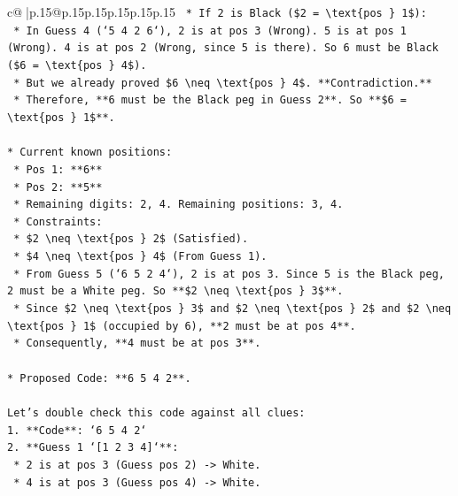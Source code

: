 \documentclass{article}
\begin{document}
{\begin{supertabular}{c@{$\;$}|p{.15\linewidth}@{}p{.15\linewidth}p{.15\linewidth}p{.15\linewidth}p{.15\linewidth}p{.15\linewidth}}
{{{\texttt{        *   If 2 is Black (\$2 = \textbackslash{}text\{pos \} 1\$):} \\
\texttt{            *   In Guess 4 (`5 4 2 6`), 2 is at pos 3 (Wrong). 5 is at pos 1 (Wrong). 4 is at pos 2 (Wrong, since 5 is there). So 6 must be Black (\$6 = \textbackslash{}text\{pos \} 4\$).} \\
\texttt{            *   But we already proved \$6 \textbackslash{}neq \textbackslash{}text\{pos \} 4\$. **Contradiction.**} \\
\texttt{        *   Therefore, **6 must be the Black peg in Guess 2**. So **\$6 = \textbackslash{}text\{pos \} 1\$**.} \\
\\ 
\texttt{*   Current known positions:} \\
\texttt{    *   Pos 1: **6**} \\
\texttt{    *   Pos 2: **5**} \\
\texttt{    *   Remaining digits: 2, 4. Remaining positions: 3, 4.} \\
\texttt{    *   Constraints:} \\
\texttt{        *   \$2 \textbackslash{}neq \textbackslash{}text\{pos \} 2\$ (Satisfied).} \\
\texttt{        *   \$4 \textbackslash{}neq \textbackslash{}text\{pos \} 4\$ (From Guess 1).} \\
\texttt{        *   From Guess 5 (`6 5 2 4`), 2 is at pos 3. Since 5 is the Black peg, 2 must be a White peg. So **\$2 \textbackslash{}neq \textbackslash{}text\{pos \} 3\$**.} \\
\texttt{        *   Since \$2 \textbackslash{}neq \textbackslash{}text\{pos \} 3\$ and \$2 \textbackslash{}neq \textbackslash{}text\{pos \} 2\$ and \$2 \textbackslash{}neq \textbackslash{}text\{pos \} 1\$ (occupied by 6), **2 must be at pos 4**.} \\
\texttt{        *   Consequently, **4 must be at pos 3**.} \\
\\ 
\texttt{*   Proposed Code: **6 5 4 2**.} \\
\\ 
\texttt{Let's double check this code against all clues:} \\
\texttt{1.  **Code**: `6 5 4 2`} \\
\texttt{2.  **Guess 1 `{[}1 2 3 4{]}`**:} \\
\texttt{    *   2 is at pos 3 (Guess pos 2) {-}> White.} \\
\texttt{    *   4 is at pos 3 (Guess pos 4) {-}> White.} \\
}}}
\end{supertabular}}
\end{document}
